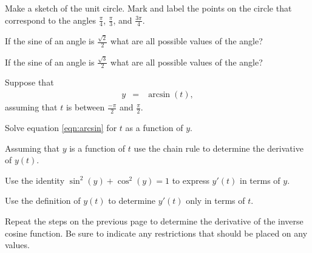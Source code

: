 
\begin{problem}
\item Make a sketch of the unit circle. Mark and label the points on
  the circle that correspond to the angles $\frac{\pi}{4}$,
  $\frac{\pi}{3}$, and $\frac{3\pi}{4}$.
  \vfill
  \vfill
\item If the sine of an angle is $\frac{\sqrt{2}}{2}$ what are all
  possible values of the angle?
  \vfill
\item If the sine of an angle is $\frac{\sqrt{3}}{2}$ what are all
  possible values of the angle?
  \vfill
\end{problem}


\begin{problem}
\item Suppose that
  \begin{eqnarray}
    \label{eqn:arcsin}
    y &= & \arcsin(t),
  \end{eqnarray}
  assuming that $t$ is between $\frac{-\pi}{2}$ and $\frac{\pi}{2}$.
  \begin{subproblem}
    \item Solve equation \ref{eqn:arcsin} for $t$ as a function of
      $y$.
      \vfill
    \item Assuming that $y$ is a function of $t$ use the chain rule to
      determine the derivative of $y(t)$.
      \vfill
    \item Use the identity $\sin^2(y)+\cos^2(y)=1$ to express $y'(t)$
      in terms of $y$.
      \vfill

    \item Use the definition of $y(t)$ to determine $y'(t)$ only in
      terms of $t$.
      \vfill

    \end{subproblem}

    \clearpage

  \item Repeat the steps on the previous page to determine the
    derivative of the inverse cosine function. Be sure to indicate
    any restrictions that should be placed on any values.

    \vfill

\end{problem}

